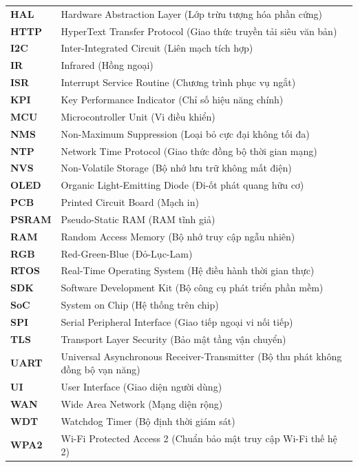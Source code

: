 \begin{longtable}{>{\bfseries}p{2.5cm} p{}}
  HAL     & Hardware Abstraction Layer (Lớp trừu tượng hóa phần cứng) \\
  HTTP    & HyperText Transfer Protocol (Giao thức truyền tải siêu văn bản) \\
  I2C     & Inter-Integrated Circuit (Liên mạch tích hợp) \\
  IR      & Infrared (Hồng ngoại) \\
  ISR     & Interrupt Service Routine (Chương trình phục vụ ngắt) \\
  KPI     & Key Performance Indicator (Chỉ số hiệu năng chính) \\
  MCU     & Microcontroller Unit (Vi điều khiển) \\
  NMS     & Non-Maximum Suppression (Loại bỏ cực đại không tối đa) \\
  NTP     & Network Time Protocol (Giao thức đồng bộ thời gian mạng) \\
  NVS     & Non-Volatile Storage (Bộ nhớ lưu trữ không mất điện) \\
  OLED    & Organic Light-Emitting Diode (Đi-ốt phát quang hữu cơ) \\
  PCB     & Printed Circuit Board (Mạch in) \\
  PSRAM   & Pseudo-Static RAM (RAM tĩnh giả) \\
  RAM     & Random Access Memory (Bộ nhớ truy cập ngẫu nhiên) \\
  RGB     & Red-Green-Blue (Đỏ-Lục-Lam) \\
  RTOS    & Real-Time Operating System (Hệ điều hành thời gian thực) \\
  SDK     & Software Development Kit (Bộ công cụ phát triển phần mềm) \\
  SoC     & System on Chip (Hệ thống trên chip) \\
  SPI     & Serial Peripheral Interface (Giao tiếp ngoại vi nối tiếp) \\
  TLS     & Transport Layer Security (Bảo mật tầng vận chuyển) \\
  UART    & Universal Asynchronous Receiver-Transmitter (Bộ thu phát không đồng bộ vạn năng) \\
  UI      & User Interface (Giao diện người dùng) \\
  WAN     & Wide Area Network (Mạng diện rộng) \\
  WDT     & Watchdog Timer (Bộ định thời giám sát) \\
  WPA2    & Wi-Fi Protected Access 2 (Chuẩn bảo mật truy cập Wi-Fi thế hệ 2) \\
\end{longtable}
